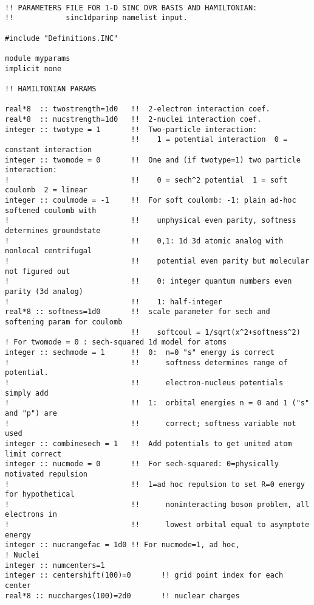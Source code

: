 \begin{verbatim}

!! PARAMETERS FILE FOR 1-D SINC DVR BASIS AND HAMILTONIAN:
!!            sinc1dparinp namelist input.

#include "Definitions.INC"

module myparams
implicit none

!! HAMILTONIAN PARAMS

real*8  :: twostrength=1d0   !!  2-electron interaction coef.
real*8  :: nucstrength=1d0   !!  2-nuclei interaction coef.
integer :: twotype = 1       !!  Two-particle interaction:
                             !!    1 = potential interaction  0 = constant interaction
integer :: twomode = 0       !!  One and (if twotype=1) two particle interaction:
!                            !!    0 = sech^2 potential  1 = soft coulomb  2 = linear
integer :: coulmode = -1     !!  For soft coulomb: -1: plain ad-hoc softened coulomb with 
!                            !!    unphysical even parity, softness determines groundstate
!                            !!    0,1: 1d 3d atomic analog with nonlocal centrifugal
!                            !!    potential even parity but molecular not figured out
!                            !!    0: integer quantum numbers even parity (3d analog)
!                            !!    1: half-integer
real*8 :: softness=1d0       !!  scale parameter for sech and softening param for coulomb
                             !!    softcoul = 1/sqrt(x^2+softness^2)
! For twomode = 0 : sech-squared 1d model for atoms
integer :: sechmode = 1      !!  0:  n=0 "s" energy is correct
!                            !!      softness determines range of potential.
!                            !!      electron-nucleus potentials simply add
!                            !!  1:  orbital energies n = 0 and 1 ("s" and "p") are
!                            !!      correct; softness variable not used
integer :: combinesech = 1   !!  Add potentials to get united atom limit correct
integer :: nucmode = 0       !!  For sech-squared: 0=physically motivated repulsion
!                            !!  1=ad hoc repulsion to set R=0 energy for hypothetical
!                            !!      noninteracting boson problem, all electrons in
!                            !!      lowest orbital equal to asymptote energy
integer :: nucrangefac = 1d0 !! For nucmode=1, ad hoc, 
! Nuclei
integer :: numcenters=1
integer :: centershift(100)=0       !! grid point index for each center
real*8 :: nuccharges(100)=2d0       !! nuclear charges


\end{verbatim}
